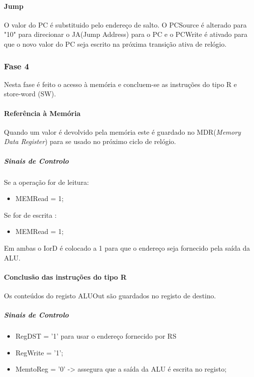 \documentclass[10pt,a4paper]{book}
\begin{document}
			\paragraph{Jump}

			O valor do PC é substituido pelo endereço de salto. O PCSource é alterado para "10" para direcionar o JA(Jump Address) para o PC e o PCWrite é ativado para que o novo valor do PC seja escrito na próxima transição ativa de relógio.


			\subsubsection{Fase 4}

			Nesta fase é feito o acesso à memória e concluem-se as instruções do tipo R e  store-word (SW).

			\paragraph{Referência à Memória}

			Quando um valor é devolvido pela memória este é guardado no MDR(\textit{Memory Data Register}) para se usado no próximo ciclo de relógio.

			\subparagraph{Sinais de Controlo}


			Se a operação for de leitura:
			\begin{itemize}
				\item MEMRead = 1;
			\end{itemize}

			Se for de escrita :

			\begin{itemize}
				\item MEMRead = 1;
			\end{itemize}

			Em ambas o IorD é colocado a 1 para que o endereço seja fornecido pela saída da ALU.


			\paragraph{Conclusão das instruções do tipo R}

			Os conteúdos do registo ALUOut são guardados no registo de destino.

			\subparagraph{Sinais de Controlo}

			\begin{itemize}
			\item RegDST = '1' para usar o endereço fornecido por RS
			\item RegWrite = '1';
			\item MemtoReg = '0' -> assegura que a saída da ALU é escrita no registo;
			\end{itemize}
\end{document}
